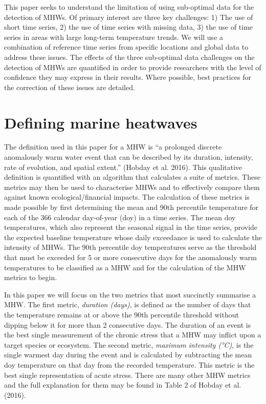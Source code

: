 \documentclass[]{article}
\begin{document}
This paper seeks to understand the limitation of using sub-optimal data
for the detection of MHWs. Of primary interest are three key challenges:
1) The use of short time series, 2) the use of time series with missing
data, 3) the use of time series in areas with large long-term
temperature trends. We will use a combination of reference time series
from specific locations and global data to address these issues. The
effects of the three sub-optimal data challenges on the detection of
MHWs are quantified in order to provide researchers with the level of
confidence they may express in their results. Where possible, best
practices for the correction of these issues are detailed.

\section{Defining marine heatwaves}\label{defining-marine-heatwaves}

The definition used in this paper for a MHW is ``a prolonged discrete
anomalously warm water event that can be described by its duration,
intensity, rate of evolution, and spatial extent.'' (Hobday et al.
2016). This qualitative definition is quantified with an algorithm that
calculates a suite of metrics. These metrics may then be used to
characterise MHWs and to effectively compare them against known
ecological/financial impacts. The calculation of these metrics is made
possible by first determining the mean and 90th percentile temperature
for each of the 366 calendar day-of-year (doy) in a time series. The
mean doy temperatures, which also represent the seasonal signal in the
time series, provide the expected baseline temperature whose daily
exceedance is used to calculate the intensity of MHWs. The 90th
percentile doy temperatures serve as the threshold that must be exceeded
for 5 or more consecutive days for the anomalously warm temperatures to
be classified as a MHW and for the calculation of the MHW metrics to
begin.

In this paper we will focus on the two metrics that most succinctly
summarise a MHW. The first metric, \emph{duration (days)}, is defined as
the number of days that the temperature remains at or above the 90th
percentile threshold without dipping below it for more than 2
consecutive days. The duration of an event is the best single
measurement of the chronic stress that a MHW may inflict upon a target
species or ecosystem. The second metric, \emph{maximum intensity (°C)},
is the single warmest day during the event and is calculated by
subtracting the mean doy temperature on that day from the recorded
temperature. This metric is the best single representation of acute
stress. There are many other MHW metrics and the full explanation for
them may be found in Table 2 of Hobday et al. (2016).
\end{document}
